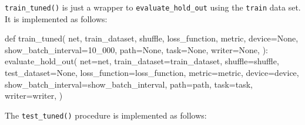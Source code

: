 \documentclass[
  letterpaper,
  DIV=11,
  numbers=noendperiod]{scrreprt}
\newenvironment{Shaded}{\begin{snugshade}}{\end{snugshade}}
\newcommand{\NormalTok}[1]{\textcolor[rgb]{0.00,0.23,0.31}{#1}}
\begin{document}
\texttt{train\_tuned()} is just a wrapper to
\texttt{evaluate\_hold\_out} using the \texttt{train} data set. It is
implemented as follows:

\begin{Shaded}
\begin{Highlighting}[]
\NormalTok{def train\_tuned(}
\NormalTok{    net,}
\NormalTok{    train\_dataset,}
\NormalTok{    shuffle,}
\NormalTok{    loss\_function,}
\NormalTok{    metric,}
\NormalTok{    device=None,}
\NormalTok{    show\_batch\_interval=10\_000,}
\NormalTok{    path=None,}
\NormalTok{    task=None,}
\NormalTok{    writer=None,}
\NormalTok{):}
\NormalTok{    evaluate\_hold\_out(}
\NormalTok{        net=net,}
\NormalTok{        train\_dataset=train\_dataset,}
\NormalTok{        shuffle=shuffle,}
\NormalTok{        test\_dataset=None,}
\NormalTok{        loss\_function=loss\_function,}
\NormalTok{        metric=metric,}
\NormalTok{        device=device,}
\NormalTok{        show\_batch\_interval=show\_batch\_interval,}
\NormalTok{        path=path,}
\NormalTok{        task=task,}
\NormalTok{        writer=writer,}
\NormalTok{    )}
\end{Highlighting}
\end{Shaded}

The \texttt{test\_tuned()} procedure is implemented as follows:
\end{document}
